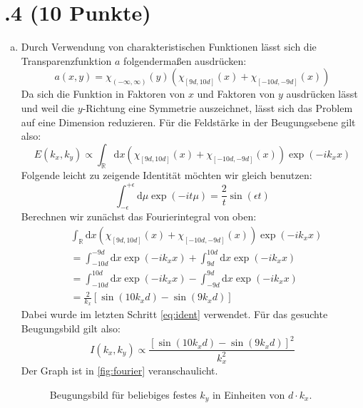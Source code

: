 \section*{\nr.4 \titfour (10 Punkte)}
\begin{enumerate}[(a)]
\item Durch Verwendung von charakteristischen Funktionen lässt sich die Transparenzfunktion $a$ folgendermaßen ausdrücken:
\begin{equation}
a(x,y) = \chi_{(-\infty,\infty)} (y) \left(\chi_{[9d,10d]}(x) + \chi_{[-10d,-9d]}(x) \right)
\end{equation}
Da sich die Funktion in Faktoren von $x$ und Faktoren von $y$ ausdrücken lässt und weil die $y$-Richtung eine Symmetrie auszeichnet, lässt sich das Problem auf eine Dimension reduzieren. Für die Feldstärke in der Beugungsebene gilt also:
\begin{equation}
E(k_x,k_y) \propto \int_\mathbb{R} \mathrm{d}x \left(\chi_{[9d,10d]}(x) + \chi_{[-10d,-9d]}(x) \right)\exp(-ik_x x)
\end{equation}
Folgende leicht zu zeigende Identität möchten wir gleich benutzen:
\begin{equation}
\int_{-\epsilon}^{+\epsilon}\mathrm{d}\mu\exp(-it\mu) = \frac{2}{t}\sin(\epsilon t)
\label{eq:ident}
\end{equation}
Berechnen wir zunächst das Fourierintegral von oben:
\begin{align}
&\int_\mathbb{R} \mathrm{d}x \left(\chi_{[9d,10d]}(x) + \chi_{[-10d,-9d]}(x) \right)\exp(-ik_x x) \\
&= \int_{-10d}^{-9d}\mathrm{d}x\exp(-ik_x x) +\int_{9d}^{10d}\mathrm{d}x\exp(-ik_x x) \\
&= \int_{-10d}^{10d}\mathrm{d}x\exp(-ik_x x) -\int_{-9d}^{9d}\mathrm{d}x\exp(-ik_x x) \\
&= \frac{2}{k_x} \left[ \sin(10k_x d) - \sin(9k_x d) \right]
\end{align}
Dabei wurde im letzten Schritt \vref{eq:ident} verwendet.
Für das gesuchte Beugungsbild gilt also:
\begin{equation}
I(k_x,k_y) \propto \frac{\left[ \sin(10k_x d) - \sin(9k_x d) \right]^2}{k_x^2}
\end{equation}
Der Graph ist in \vref{fig:fourier} veranschaulicht. 
\begin{figure}[htbp]
\centering

\caption{Beugungsbild für beliebiges festes $k_y$ in Einheiten von $d\cdot k_x$.}
\label{fig:fourier}
\end{figure}


\end{enumerate}
